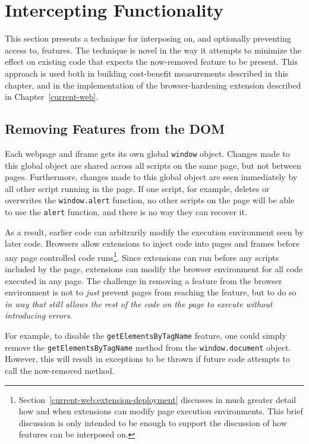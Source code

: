 \section{Intercepting \JS Functionality}
\label{cost-benefit:intercepting-js}

This section presents a technique for interposing on, and optionally preventing
access to, \WAPI features.  The technique is novel in the way it attempts to
minimize the effect on existing code that expects the now-removed feature to be
present.  This approach is used both in building cost-benefit measurements
described in this chapter, and in the implementation of the browser-hardening
extension described in Chapter~\ref{current-web}.


\subsection{Removing Features from the DOM}
\label{cost-benefit:intercepting-js:featremove}
Each webpage and iframe gets its own global \texttt{window} object.  Changes
made to this global object are shared across all scripts on the same page, but
not between pages.  Furthermore, changes made to this global object are seen
immediately by all other script running in the page.  If one script, for
example, deletes or overwrites the \texttt{window.alert} function, no other
scripts on the page will be able to use the \texttt{alert} function, and there
is no way they can recover it.

As a result, earlier code can arbitrarily modify the execution environment seen
by later code.  Browsers allow extensions to inject \JS code into pages and
frames before any page controlled code
runs\footnote{Section~\ref{current-web:extension-deployment} discusses in much
greater detail how and when extensions can modify page execution environments.
This brief discussion is only intended to be enough to support the discussion
of how \WAPI features can be interposed on.}. Since extensions can run
before any scripts included by the page, extensions can modify the browser
environment for all code executed in any page.  The challenge in removing a
feature from the browser environment is not to \emph{just} prevent pages from
reaching the feature, but to do so \emph{in way that still allows the rest of
the code on the page to execute without introducing errors}.

For example, to disable the \texttt{getElementsByTagName} feature, one could
simply remove the \texttt{getElementsByTagName} method from the
\texttt{window.document} object. However, this will result in exceptions to
be thrown if future code attempts to call the now-removed method.

